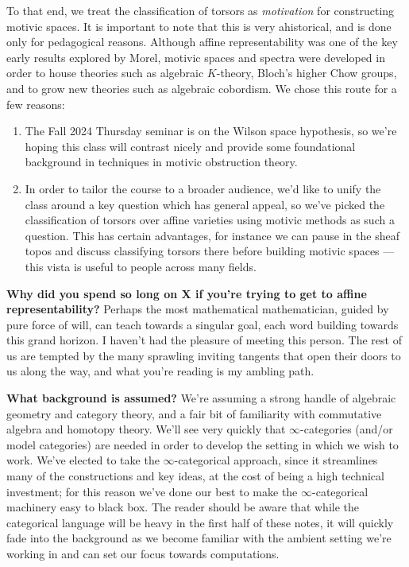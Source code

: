 \documentclass[11pt,openany]{book}
\begin{document}
To that end, we treat the classification of torsors as \textit{motivation} for constructing motivic spaces. It is important to note that this is very ahistorical, and is done only for pedagogical reasons. Although affine representability was one of the key early results explored by Morel, motivic spaces and spectra were developed in order to house theories such as algebraic $K$-theory, Bloch's higher Chow groups, and to grow new theories such as algebraic cobordism. We chose this route for a few reasons:
\begin{enumerate}
    \item The Fall 2024 Thursday seminar is on the Wilson space hypothesis, so we're hoping this class will contrast nicely and provide some foundational background in techniques in motivic obstruction theory.
    \item In order to tailor the course to a broader audience, we'd like to unify the class around a key question which has general appeal, so we've picked the classification of torsors over affine varieties using motivic methods as such a question. This has certain advantages, for instance we can pause in the sheaf topos and discuss classifying torsors there before building motivic spaces --- this vista is useful to people across many fields.
\end{enumerate}

\textbf{Why did you spend so long on X if you're trying to get to affine representability?} Perhaps the most mathematical mathematician, guided by pure force of will, can teach towards a singular goal, each word building towards this grand horizon. I haven't had the pleasure of meeting this person. The rest of us are tempted by the many sprawling inviting tangents that open their doors to us along the way, and what you're reading is my ambling path.

\textbf{What background is assumed?} We're assuming a strong handle of algebraic geometry and category theory, and a fair bit of familiarity with commutative algebra and homotopy theory. We'll see very quickly that $\infty$-categories (and/or model categories) are needed in order to develop the setting in which we wish to work. We've elected to take the $\infty$-categorical approach, since it streamlines many of the constructions and key ideas, at the cost of being a high technical investment; for this reason we've done our best to make the $\infty$-categorical machinery easy to black box. The reader should be aware that while the categorical language will be heavy in the first half of these notes, it will quickly fade into the background as we become familiar with the ambient setting we're working in and can set our focus towards computations.
\end{document}
